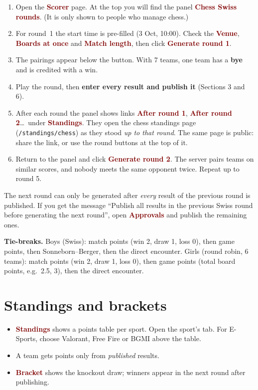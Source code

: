 \documentclass[11pt,a4paper]{article}
\newcommand{\ui}[1]{\textbf{\textcolor{maroon}{#1}}}
\begin{document}
\begin{enumerate}
  \item Open the \ui{Scorer} page. At the top you will find the panel \ui{Chess Swiss rounds}. (It is only shown to people who manage chess.)
  \item For round~1 the start time is pre-filled (3 Oct, 10:00). Check the \ui{Venue}, \ui{Boards at once} and \ui{Match length}, then click \ui{Generate round 1}.
  \item The pairings appear below the button. With 7 teams, one team has a \textbf{bye} and is credited with a win.
  \item Play the round, then \textbf{enter every result and publish it} (Sections 3 and 6).
  \item After each round the panel shows links \ui{After round 1}, \ui{After round 2}\ldots\ under \ui{Standings}. They open the chess standings page (\texttt{/standings/chess}) as they stood \emph{up to that round}. The same page is public: share the link, or use the round buttons at the top of it.
  \item Return to the panel and click \ui{Generate round 2}. The server pairs teams on similar scores, and nobody meets the same opponent twice. Repeat up to round 5.
\end{enumerate}

\begin{warn}
The next round can only be generated after \emph{every} result of the previous round is published. If you get the message
``Publish all results in the previous Swiss round before generating the next round'', open \ui{Approvals} and publish the remaining ones.
\end{warn}

\textbf{Tie-breaks.} Boys (Swiss): match points (win 2, draw 1, loss 0), then game points, then Sonneborn--Berger, then the direct encounter.
Girls (round robin, 6 teams): match points (win 2, draw 1, loss 0), then game points (total board points, e.g.\ 2.5, 3), then the direct encounter.

\section{Standings and brackets}

\begin{itemize}
  \item \ui{Standings} shows a points table per sport. Open the sport's tab. For E-Sports, choose Valorant, Free Fire or BGMI above the table.
  \item A team gets points only from \emph{published} results.
  \item \ui{Bracket} shows the knockout draw; winners appear in the next round after publishing.
\end{itemize}
\end{document}
